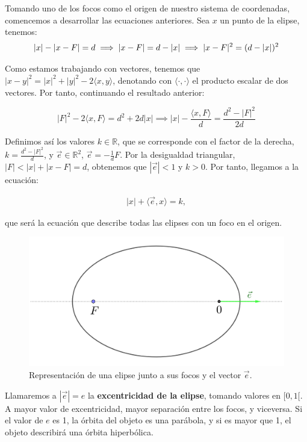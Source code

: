 \documentclass[11pt]{article}
\begin{document}
Tomando uno de los focos como el origen de nuestro sistema de coordenadas, comencemos a desarrollar las ecuaciones anteriores. Sea $x$ un punto de la elipse, tenemos:
\[
|x|-|x-F|=d \implies |x-F|=d-|x| \implies |x-F|^2=(d-|x|)^2\\
\]

Como estamos trabajando con vectores, tenemos que $|x-y|^2=|x|^2+|y|^2-2\langle x,y\rangle$, denotando con $\langle\cdot,\cdot\rangle$ el producto escalar de dos vectores. Por tanto, continuando el resultado anterior:

\[
|F|^2-2\langle x,F\rangle=d^2+2d|x| \implies |x|-\frac{\langle x,F\rangle}{d}=\frac{d^2-|F|^2}{2d}
\]


Definimos así los valores $k\in\mathbb{R}$, que se corresponde con el factor de la derecha, $k=\frac{d^2-|F|^2}{d}$, y $\vec{e}\in\mathbb{R}^2$, $\vec{e}=-\frac{1}{d}F$. Por la desigualdad triangular, $|F|<|x|+|x-F|=d$, obtenemos que $|\vec{e}|<1$ y $k>0$. Por tanto, llegamos a la ecuación:

\begin{align}
|x|+\langle \vec{e},x\rangle=k,
\label{eq:elipse_cartesiana}
\end{align}

\noindent que será la ecuación que describe todas las elipses con un foco en el origen.\\

\begin{figure}[H]
\centering
\includegraphics[scale=0.1]{images/elipse_excentricidad.png}
\caption{Representación de una elipse junto a sus focos y el vector $\vec{e}$.}
\label{fig:elipse_excentricidad}
\end{figure}

Llamaremos a $|\vec{e}|=e$ la \textbf{excentricidad de la elipse}, tomando valores en $[0,1[$. A mayor valor de excentricidad, mayor separación entre los focos, y viceversa. Si el valor de $e$ es 1, la órbita del objeto es una parábola, y si es mayor que 1, el objeto describirá una órbita hiperbólica.\\
\end{document}
